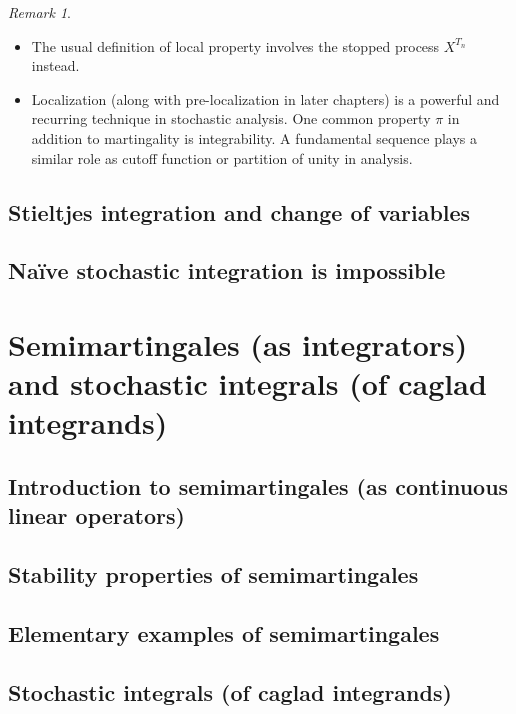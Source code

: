\documentclass[openany,oneside]{book}
\theoremstyle{definition}
\theoremstyle{remark}
\newtheorem{rem}[thm]{Remark}
\begin{document}
\begin{rem}\
\begin{itemize}
\item The usual definition of local property involves the stopped process $X^{T_n}$ instead.
\item Localization (along with pre-localization in later chapters) is a powerful and recurring technique in stochastic analysis. One common property $\pi$ in addition to martingality is integrability. A fundamental sequence plays a similar role as cutoff function or partition of unity in analysis.
\end{itemize}
\end{rem}

\section{Stieltjes integration and change of variables}

\section{Na\"ive stochastic integration is impossible}



\chapter{Semimartingales (as integrators) and stochastic integrals (of caglad integrands)}

\section{Introduction to semimartingales (as continuous linear operators)}

\section{Stability properties of semimartingales}

\section{Elementary examples of semimartingales}

\section{Stochastic integrals (of caglad integrands)}
\end{document}
